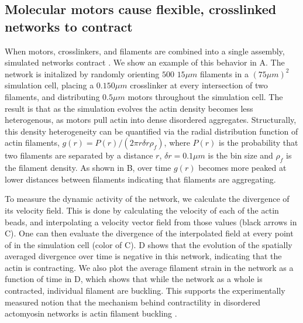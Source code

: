 \documentclass[12pt]{article}
\begin{document}
\subsection{Molecular motors cause flexible, crosslinked networks to contract}
When motors, crosslinkers, and filaments are combined into a single assembly, 
simulated networks contract \cite{freedman2016}. We show an example of this behavior
in A. The network is initalized by randomly orienting $500$ $15\mu m$ 
filaments in a $(75\mu m)^2$ simulation cell, placing a $0.150\mu m$ crosslinker at 
every intersection of two filaments, and distributing $0.5\mu m$ motors throughout the simulation cell.
The result is that as the simulation evolves the actin density becomes less heterogenous,
as motors pull actin into dense disordered aggregates. Structurally, this density 
heterogeneity can be quantified via the radial distribution function of actin filaments, 
$g(r) = P(r)/(2\pi r\delta r \rho_f)$, where $P(r)$ is the probability that two filaments 
are separated by a distance $r$, $\delta r=0.1\mu m$ is the bin size and $\rho_f$ is the
filament density. As shown in B, over time $g(r)$ becomes more 
peaked at lower distances between filaments indicating that filaments are 
aggregating. 
\par 
To measure the dynamic activity of the network, we calculate the divergence of 
its velocity field. This is done by calculating the velocity of each 
of the actin beads, and interpolating a velocity vector field from those values (black
arrows in C). One can then evaluate the divergence of the 
interpolated field at every point of in the simulation cell (color of C). 
D shows that the evolution of the spatially averaged divergence over time
is negative in this network, indicating that the actin is contracting. We also plot
the average filament strain in the network as a function of time in D, 
which shows that while the network as a whole is contracted, individual filament 
are buckling. This supports the experimentally measured notion that the mechanism
behind contractility in disordered actomyosin networks is actin filament buckling
\cite{lenz2012,murrell2012,murrell2014}.
\end{document}
